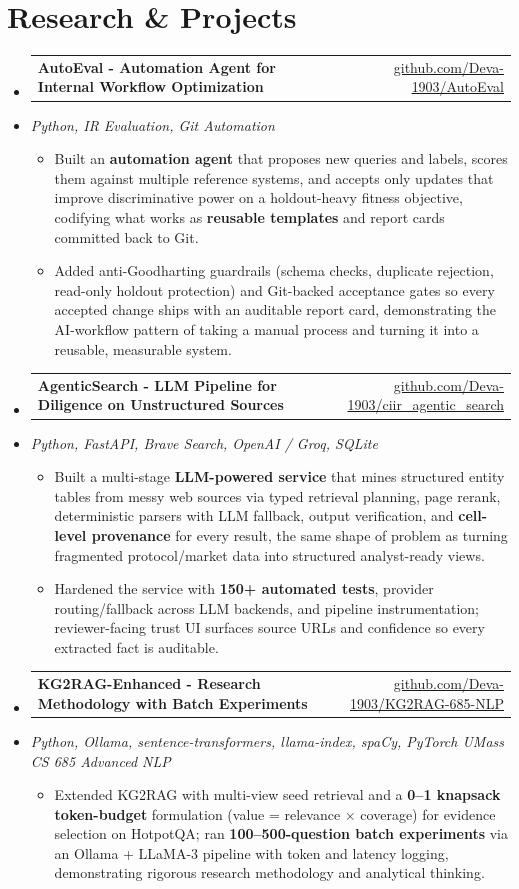 \documentclass[letterpaper,10pt]{article}
\makeatletter
\newcommand{\resumeItem}[1]{
  \item\small{#1\vspace{-1pt}}
}
\newcommand{\resumeProjectHeading}[2]{
    \item
    \begin{tabular*}{0.985\textwidth}[t]{l@{\extracolsep{\fill}}r}
      \small\textbf{#1} & \small #2 \\
    \end{tabular*}\vspace{-5pt}
}
\newcommand{\resumeProjectSubheading}[1]{
  \vspace{-2pt}\item[] {\small\textcolor{ResumeSlate}{\emph{#1}}}\vspace{-3pt}
}
\newcommand{\resumeSubHeadingListStart}{\begin{itemize}[leftmargin=0.0in, label={}, itemsep=2pt, topsep=2pt]}
\newcommand{\resumeSubHeadingListEnd}{\end{itemize}}
\newcommand{\resumeItemListStart}{\begin{itemize}[leftmargin=0.18in, itemsep=2pt, topsep=1pt]}
\newcommand{\resumeItemListEnd}{\end{itemize}\vspace{-4pt}}
\makeatother
\begin{document}
\section{Research \& Projects}
\resumeSubHeadingListStart
  \resumeProjectHeading
    {AutoEval - Automation Agent for Internal Workflow Optimization}
    {\href{https://github.com/Deva-1903/AutoEval}{github.com/Deva-1903/AutoEval}}
  \resumeProjectSubheading{Python, IR Evaluation, Git Automation}
    \resumeItemListStart
      \resumeItem{Built an \textbf{automation agent} that proposes new queries and labels, scores them against multiple reference systems, and accepts only updates that improve discriminative power on a holdout-heavy fitness objective, codifying what works as \textbf{reusable templates} and report cards committed back to Git.}
      \resumeItem{Added anti-Goodharting guardrails (schema checks, duplicate rejection, read-only holdout protection) and Git-backed acceptance gates so every accepted change ships with an auditable report card, demonstrating the AI-workflow pattern of taking a manual process and turning it into a reusable, measurable system.}
    \resumeItemListEnd
  \resumeProjectHeading
    {AgenticSearch - LLM Pipeline for Diligence on Unstructured Sources}
    {\href{https://github.com/Deva-1903/ciir_agentic_search}{github.com/Deva-1903/ciir\_agentic\_search}}
  \resumeProjectSubheading{Python, FastAPI, Brave Search, OpenAI / Groq, SQLite}
    \resumeItemListStart
      \resumeItem{Built a multi-stage \textbf{LLM-powered service} that mines structured entity tables from messy web sources via typed retrieval planning, page rerank, deterministic parsers with LLM fallback, output verification, and \textbf{cell-level provenance} for every result, the same shape of problem as turning fragmented protocol/market data into structured analyst-ready views.}
      \resumeItem{Hardened the service with \textbf{150+ automated tests}, provider routing/fallback across LLM backends, and pipeline instrumentation; reviewer-facing trust UI surfaces source URLs and confidence so every extracted fact is auditable.}
    \resumeItemListEnd
  \resumeProjectHeading
    {KG2RAG-Enhanced - Research Methodology with Batch Experiments}
    {\href{https://github.com/Deva-1903/KG2RAG-685-NLP}{github.com/Deva-1903/KG2RAG-685-NLP}}
  \resumeProjectSubheading{Python, Ollama, sentence-transformers, llama-index, spaCy, PyTorch \enspace\textbar\enspace UMass CS 685 Advanced NLP}
    \resumeItemListStart
      \resumeItem{Extended KG2RAG with multi-view seed retrieval and a \textbf{0--1 knapsack token-budget} formulation (value = relevance \(\times\) coverage) for evidence selection on HotpotQA; ran \textbf{100--500-question batch experiments} via an Ollama + LLaMA-3 pipeline with token and latency logging, demonstrating rigorous research methodology and analytical thinking.}
    \resumeItemListEnd
\resumeSubHeadingListEnd
\vspace{-4pt}
\end{document}
